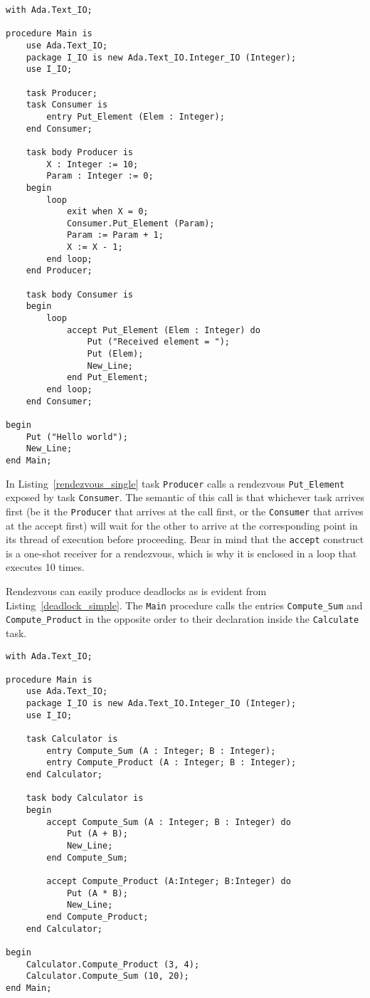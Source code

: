 \begin{minipage}{\listingwidth}
\lstset{language=ada}
\begin{lstlisting}[caption=Task rendezvous,label=rendezvous_single]
with Ada.Text_IO;

procedure Main is
	use Ada.Text_IO;
	package I_IO is new Ada.Text_IO.Integer_IO (Integer);
	use I_IO;

	task Producer;
	task Consumer is
		entry Put_Element (Elem : Integer);
	end Consumer;

	task body Producer is
		X : Integer := 10;
		Param : Integer := 0;
	begin
		loop
			exit when X = 0;
			Consumer.Put_Element (Param);
			Param := Param + 1;
			X := X - 1;
		end loop;
	end Producer;

	task body Consumer is
	begin
		loop
			accept Put_Element (Elem : Integer) do
				Put ("Received element = ");
				Put (Elem);
				New_Line;
			end Put_Element;
		end loop;
	end Consumer;

begin
	Put ("Hello world");
	New_Line;
end Main;
\end{lstlisting}
\end{minipage}

In Listing~\ref{rendezvous_single} task \texttt{Producer} calls a
rendezvous \texttt{Put\_Element} exposed by task
\texttt{Consumer}. The semantic of this call is that whichever task
arrives first (be it the \texttt{Producer} that arrives at the call
first, or the \texttt{Consumer} that arrives at the accept first) will
wait for the other to arrive at the corresponding point in its thread
of execution before proceeding. Bear in mind that the \texttt{accept}
construct is a one-shot receiver for a rendezvous, which is why it is
enclosed in a loop that executes 10 times.

Rendezvous can easily produce deadlocks as is evident from
Listing~\ref{deadlock_simple}. The \texttt{Main} procedure calls the
entries \texttt{Compute\_Sum} and \texttt{Compute\_Product} in the
opposite order to their declaration inside the \texttt{Calculate}
task.

\begin{minipage}{\listingwidth}
\lstset{language=ada}
\begin{lstlisting}[caption=Deadlock in rendezvous caused by
    call/accept order inversion,label=deadlock_simple]
with Ada.Text_IO;

procedure Main is
	use Ada.Text_IO;
	package I_IO is new Ada.Text_IO.Integer_IO (Integer);
	use I_IO;

	task Calculator is
		entry Compute_Sum (A : Integer; B : Integer);
		entry Compute_Product (A : Integer; B : Integer);
	end Calculator;

	task body Calculator is
	begin
		accept Compute_Sum (A : Integer; B : Integer) do
			Put (A + B);
			New_Line;
		end Compute_Sum;

		accept Compute_Product (A:Integer; B:Integer) do
			Put (A * B);
			New_Line;
		end Compute_Product;
	end Calculator;

begin
	Calculator.Compute_Product (3, 4);
	Calculator.Compute_Sum (10, 20);
end Main;
\end{lstlisting}
\end{minipage}


